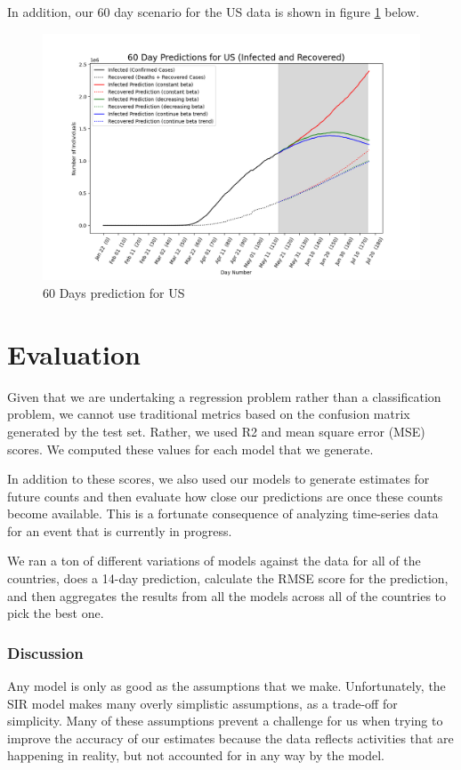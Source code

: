 \documentclass[11pt]{article}
\begin{document}
In addition, our 60 day scenario for the US data is shown in figure \ref{fig:60-days-prediction-us} below. 

\begin{figure}[h]
    \includegraphics[width=16cm]{images/60-days-prediction-US.png}
    \centering
    \caption{60 Days prediction for US}
    \label{fig:60-days-prediction-us}
\end{figure}

\section{Evaluation}
Given that we are undertaking a regression problem rather than a classification problem, we cannot use traditional metrics based on the confusion matrix generated by the test set.  Rather, we used R2 and mean square error (MSE) scores. We computed these values for each model that we generate. 

In addition to these scores, we also used our models to generate estimates for future counts and then evaluate how close our predictions are once these counts become available. This is a fortunate consequence of analyzing time-series data for an event that is currently in progress.

We ran a ton of different variations of models against the data for all of the countries, does a 14-day prediction, calculate the RMSE score for the prediction, and then aggregates the results from all the models across all of the countries to pick the best one.

\subsubsection{Discussion}
Any model is only as good as the assumptions that we make. Unfortunately, the SIR model makes many overly simplistic assumptions, as a trade-off for simplicity. Many of these assumptions prevent a challenge for us when trying to improve the accuracy of our estimates because the data reflects activities that are happening in reality, but not accounted for in any way by the model.
\end{document}
